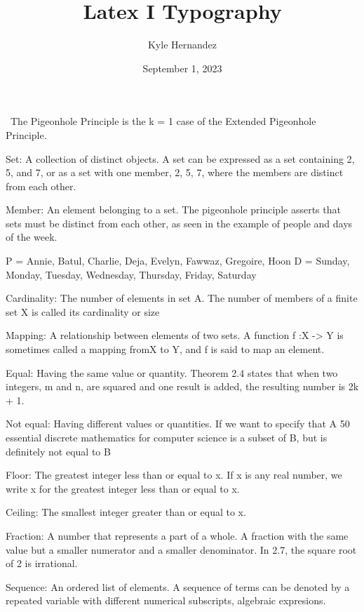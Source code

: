 \documentclass{article}
\title{Latex I Typography}
\author{Kyle Hernandez}
\date{September 1, 2023}
\begin{document}
\maketitle
\
The Pigeonhole Principle is the
k
= 1 case of the Extended Pigeonhole
Principle.


Set: A collection of distinct objects.
A set can be expressed as a set containing 2, 5, and 7, or as a set with one member, {2, 5, 7}, where the members are distinct from each other.


Member: An element belonging to a set.
The pigeonhole principle asserts that sets must be distinct from each other, as seen in the example of people and days of the week.

P = {Annie, Batul, Charlie, Deja, Evelyn, Fawwaz, Gregoire, Hoon
}
D = {Sunday, Monday, Tuesday, Wednesday, Thursday, Friday,
Saturday
}

Cardinality: The number of elements in set A.
The number of
members of a finite set X is called its cardinality or size

Mapping: A relationship between elements of two sets.
A function f :X -> Y is sometimes called a mapping fromX to Y, and f is said to map an element.

Equal: Having the same value or quantity.
Theorem 2.4 states that when two integers, m and n, are squared and one result is added, the resulting number is 2k + 1.

Not equal: Having different values or quantities.
 If we want to specify that A
50 essential discrete mathematics for computer science
is a subset of B, but is definitely not equal to B

Floor: The greatest integer less than or equal to x.
If x is any real number, we write x for the greatest integer less than or equal to x.

Ceiling: The smallest integer greater than or equal to x.

Fraction: A number that represents a part of a whole.
A fraction with the same value but a smaller numerator and
a smaller denominator. In 2.7, the square root of 2 is irrational.

Sequence: An ordered list of elements.
A sequence of terms can be denoted by a repeated variable with different
numerical subscripts, algebraic expresions.
\end{document}
